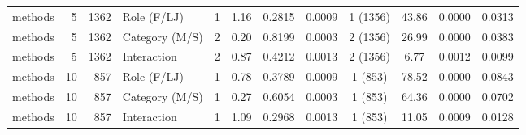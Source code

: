 \begin{table}[H]
{\begin{tabular}{l r r l ccc r ccc r}
methods & 5 & 1362 & Role (F/LJ) & 1 & 1.16 & 0.2815 & 0.0009 & 1 (1356) & 43.86 & 0.0000 & 0.0313 \\ 
methods & 5 & 1362 & Category (M/S) & 2 & 0.20 & 0.8199 & 0.0003 & 2 (1356) & 26.99 & 0.0000 & 0.0383 \\ 
methods & 5 & 1362 & Interaction & 2 & 0.87 & 0.4212 & 0.0013 & 2 (1356) & 6.77 & 0.0012 & 0.0099 \\ 
methods & 10 & 857 & Role (F/LJ) & 1 & 0.78 & 0.3789 & 0.0009 & 1 (853) & 78.52 & 0.0000 & 0.0843 \\ 
methods & 10 & 857 & Category (M/S) & 1 & 0.27 & 0.6054 & 0.0003 & 1 (853) & 64.36 & 0.0000 & 0.0702 \\ 
methods & 10 & 857 & Interaction & 1 & 1.09 & 0.2968 & 0.0013 & 1 (853) & 11.05 & 0.0009 & 0.0128 \\ 
\bottomrule
\end{tabular}%
} 
\label{tab:codebase_graph_latex_repository_graph_component_time_series_generated_ART_anova} 
\end{table}
\newpage 
